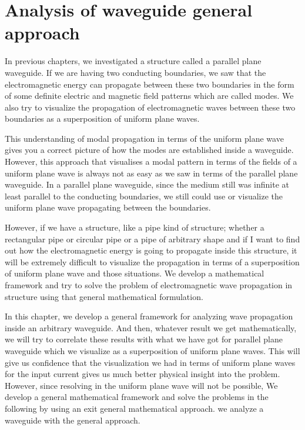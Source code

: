\chapter{Analysis of waveguide general approach}
In previous chapters, we investigated a structure called a parallel plane waveguide. If we are having two conducting boundaries, we saw that the electromagnetic energy can propagate between these two boundaries in the form of some definite electric and magnetic field patterns which are called modes. We also try to visualize the propagation of electromagnetic waves between these two boundaries as a superposition of uniform plane waves.

This understanding of modal propagation in terms of the uniform plane wave gives you a correct picture of how the modes are established inside a waveguide. However, this approach that visualises a modal pattern in terms of the fields of a uniform plane wave is always not as easy as we saw in terms of the parallel plane waveguide. In a parallel plane waveguide, since the medium still was infinite at least parallel to the conducting boundaries, we still could use or visualize the uniform plane wave propagating between the boundaries.

However, if we have a structure, like a pipe kind of structure; whether a rectangular pipe or circular pipe or a pipe of arbitrary shape and if I want to find out how the electromagnetic energy is going to propagate inside this structure, it will be extremely difficult to visualize the propagation in terms of a superposition of uniform plane wave and those situations. We develop a mathematical framework and try to solve the problem of electromagnetic wave propagation in structure using that general mathematical formulation.

In this chapter, we develop a general framework for analyzing wave propagation inside an arbitrary waveguide. And then, whatever result we get mathematically, we will try to correlate these results with what we have got for parallel plane waveguide which we visualize as a superposition of uniform plane waves. This will give us confidence that the visualization we had in terms of uniform plane waves for the input current gives us much better physical insight into the problem. However, since resolving in the uniform plane wave will not be possible, We develop a general mathematical framework and solve the problems in the following by using an exit general mathematical approach. we analyze a waveguide with the general approach. 

